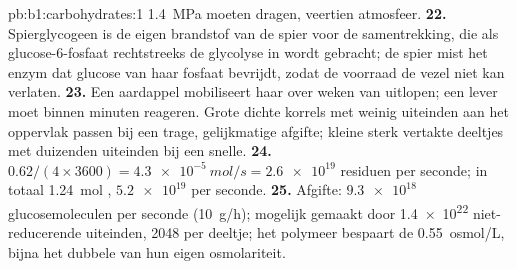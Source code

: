 \begin{solution}{pb:b1:carbohydrates:1}
\qty{1.4}{MPa} moeten dragen, veertien atmosfeer.
\textbf{22.} Spierglycogeen is de eigen brandstof van de spier voor de
samentrekking, die als glucose-6-fosfaat rechtstreeks de glycolyse in wordt
gebracht; de spier mist het enzym dat glucose van haar fosfaat bevrijdt, zodat de
voorraad de vezel niet kan verlaten.
\textbf{23.} Een aardappel mobiliseert haar  over weken van uitlopen; een
lever moet binnen minuten reageren. Grote dichte korrels met weinig uiteinden aan
het oppervlak passen bij een trage, gelijkmatige afgifte; kleine sterk vertakte
deeltjes met duizenden uiteinden bij een snelle.
\textbf{24.} $0.62/(4\times 3600) = \qty{4.3e-5}{mol/s} = \num{2.6e19}$
residuen per seconde; in totaal \qty{1.24}{mol} , $\num{5.2e19}$ per seconde.
\textbf{25.} Afgifte: $\num{9.3e18}$ glucosemoleculen per seconde
(\qty{10}{g/h}); mogelijk gemaakt door \num{1.4e22} niet-reducerende uiteinden,
\num{2048} per deeltje; het polymeer bespaart de  \qty{0.55}{osmol/L},
bijna het dubbele van hun eigen osmolariteit.
\end{solution}
